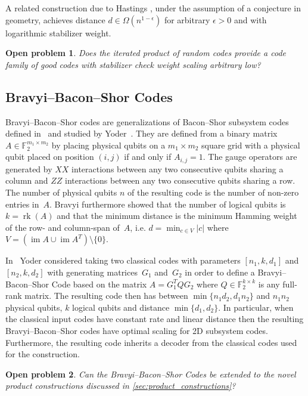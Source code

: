 \documentclass[amsmath, amssymb, floatfix, reprint, twocolumn, notitlepage, 10pt]{revtex4-1}
\newtheorem*{oproblem}{Open problem}
\newcommand{\rk}{\operatorname{rk}}
\newcommand{\im}{\operatorname{im}}
\begin{document}
A related construction due to Hastings \cite{hastings2016quantum}, under the assumption of a conjecture in geometry, achieves distance $d\in \Omega(n^{1-\epsilon})$ for arbitrary $\epsilon > 0$ and with logarithmic stabilizer weight.

\begin{oproblem}
Does the iterated product of random codes provide a code family of good codes with stabilizer check weight scaling arbitrary low?
\end{oproblem}


\subsection{Bravyi--Bacon--Shor Codes}
Bravyi--Bacon--Shor codes are generalizations of Bacon--Shor subsystem codes defined in~\cite{bravyi2011subsystem} and studied by Yoder~\cite{yoder_bbs,li2020numerical}.
They are defined from a binary matrix $A\in \mathbb{F}_2^{m_1\times m_2}$ by placing physical qubits on a $m_1\times m_2$ square grid with a physical qubit placed on position $(i,j)$ if and only if $A_{i,j}=1$.
The gauge operators are generated by $XX$ interactions between any two consecutive qubits sharing a column and $ZZ$ interactions between any two consecutive qubits sharing a row.
The number of physical qubits $n$ of the resulting code is the number of non-zero entries in~$A.$  
Bravyi furthermore showed that the number of logical qubits is $k=\rk(A)$ and that the minimum distance is the minimum Hamming weight of the row- and column-span of~$A$, i.e. $d = \min_{c\in V} |c|$ where $V = (\im A \cup \im A^T ) \setminus \{0\}$.

In~\cite{yoder_bbs} Yoder considered taking two classical codes with parameters $[n_1,k,d_1]$ and $[n_2,k,d_2]$ with generating matrices~$G_1$ and~$G_2$ in order to define a Bravyi--Bacon--Shor Code based on the matrix $A=G_1^T Q G_2$ where $Q\in \mathbb{F}_2^{k\times k}$ is any full-rank matrix.
The resulting code then has between $\min \{ n_1 d_2, d_1 n_2 \}$ and $n_1 n_2$ physical qubits, $k$ logical qubits and distance $\min \{ d_1, d_2 \}$.
In particular, when the classical input codes have constant rate and linear distance then the resulting Bravyi--Bacon--Shor codes have optimal scaling for 2D subsystem codes.
Furthermore, the resulting code inherits a decoder from the classical codes used for the construction.

\begin{oproblem}
Can the Bravyi--Bacon--Shor Codes be extended to the novel product constructions discussed in \ref{sec:product_constructions}?
\end{oproblem}
\end{document}
